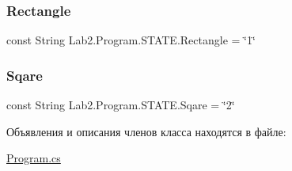 \subsubsection{\texorpdfstring{Rectangle}{Rectangle}}
{\footnotesize\ttfamily const String Lab2.\+Program.\+S\+T\+A\+T\+E.\+Rectangle = \char`\"{}1\char`\"{}}

\mbox{\label{class_lab2_1_1_program_1_1_s_t_a_t_e_a38e1a16e8f362a6c14580625b94cc191}} 
\subsubsection{\texorpdfstring{Sqare}{Sqare}}
{\footnotesize\ttfamily const String Lab2.\+Program.\+S\+T\+A\+T\+E.\+Sqare = \char`\"{}2\char`\"{}}



Объявления и описания членов класса находятся в файле\+:\begin{DoxyCompactItemize}
\item 
\hyperlink{_program_8cs}{Program.\+cs}\end{DoxyCompactItemize}
